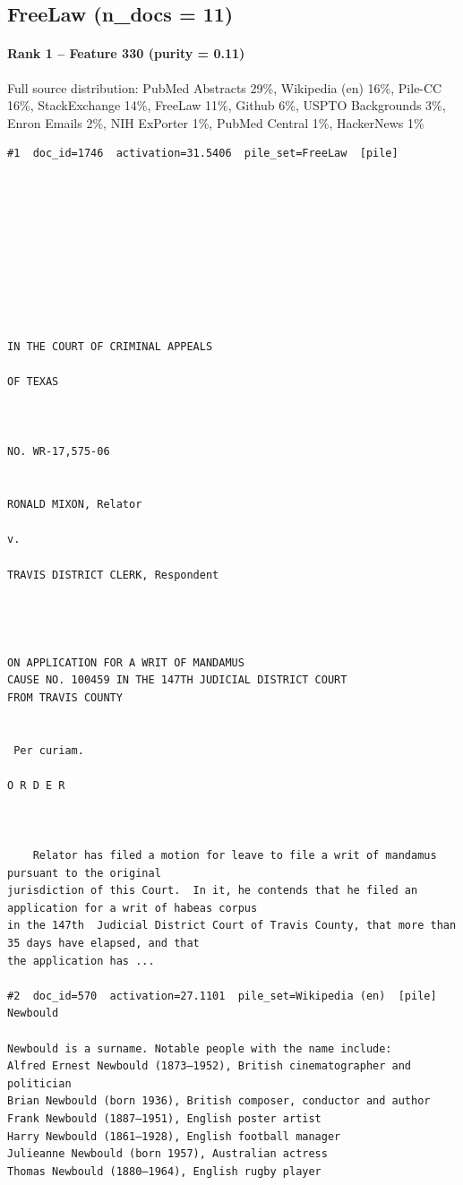 \subsection*{FreeLaw (n\_docs = 11)}

\paragraph*{Rank 1 -- Feature 330 (purity = 0.11)}

Full source distribution: PubMed Abstracts 29\%, Wikipedia (en) 16\%, Pile-CC 16\%, StackExchange 14\%, FreeLaw 11\%, Github 6\%, USPTO Backgrounds 3\%, Enron Emails 2\%, NIH ExPorter 1\%, PubMed Central 1\%, HackerNews 1\%

\begin{verbatim}
#1  doc_id=1746  activation=31.5406  pile_set=FreeLaw  [pile]










IN THE COURT OF CRIMINAL APPEALS

OF TEXAS



NO. WR-17,575-06


RONALD MIXON, Relator

v.

TRAVIS DISTRICT CLERK, Respondent




ON APPLICATION FOR A WRIT OF MANDAMUS
CAUSE NO. 100459 IN THE 147TH JUDICIAL DISTRICT COURT
FROM TRAVIS COUNTY


 Per curiam.

O R D E R



	Relator has filed a motion for leave to file a writ of mandamus pursuant to the original
jurisdiction of this Court.  In it, he contends that he filed an application for a writ of habeas corpus
in the 147th  Judicial District Court of Travis County, that more than 35 days have elapsed, and that
the application has ...

#2  doc_id=570  activation=27.1101  pile_set=Wikipedia (en)  [pile]
Newbould

Newbould is a surname. Notable people with the name include:
Alfred Ernest Newbould (1873–1952), British cinematographer and politician
Brian Newbould (born 1936), British composer, conductor and author
Frank Newbould (1887–1951), English poster artist
Harry Newbould (1861–1928), English football manager
Julieanne Newbould (born 1957), Australian actress
Thomas Newbould (1880–1964), English rugby player


\end{verbatim}
